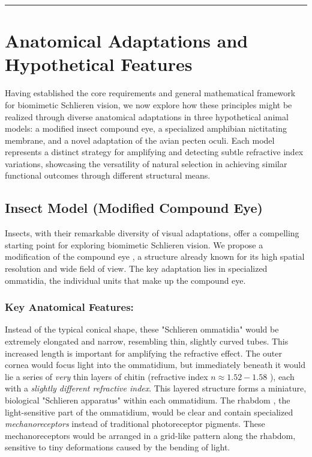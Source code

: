 \documentclass[11pt]{article}
\begin{document}
\bigskip\noindent\rule{\linewidth}{0.4pt}\bigskip

\section{Anatomical Adaptations and Hypothetical Features}

Having established the core requirements and general mathematical framework for biomimetic Schlieren vision, we now explore how these principles might be realized through diverse anatomical adaptations in three hypothetical animal models: a modified insect compound eye, a specialized amphibian nictitating membrane, and a novel adaptation of the avian pecten oculi. Each model represents a distinct strategy for amplifying and detecting subtle refractive index variations, showcasing the versatility of natural selection in achieving similar functional outcomes through different structural means.

\subsection{Insect Model (Modified Compound Eye)}

Insects, with their remarkable diversity of visual adaptations, offer a compelling starting point for exploring biomimetic Schlieren vision. We propose a modification of the compound eye \cite{Land2012AnimalEyes}, a structure already known for its high spatial resolution and wide field of view. The key adaptation lies in specialized ommatidia, the individual units that make up the compound eye.

\subsubsection{Key Anatomical Features:}
Instead of the typical conical shape, these "Schlieren ommatidia" would be extremely elongated and narrow, resembling thin, slightly curved tubes. This increased length is important for amplifying the refractive effect. The outer cornea would focus light into the ommatidium, but immediately beneath it would lie a series of \textit{very} thin layers of chitin (refractive index $n \approx 1.52-1.58$ \cite{Tsai2008ChitinOptical}), each with a \textit{slightly different refractive index}. This layered structure forms a miniature, biological "Schlieren apparatus" within each ommatidium. The rhabdom \cite{Land2012AnimalEyes}, the light-sensitive part of the ommatidium, would be clear and contain specialized \textit{mechanoreceptors} instead of traditional photoreceptor pigments. These mechanoreceptors would be arranged in a grid-like pattern along the rhabdom, sensitive to tiny deformations caused by the bending of light.
\end{document}
